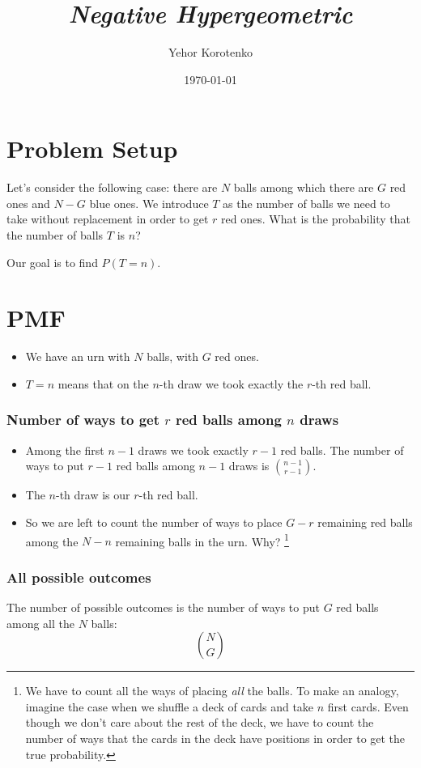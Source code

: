 \documentclass[12pt]{article}
\title{\textit{Negative Hypergeometric}}
\author{Yehor Korotenko}
\date{\today}
\begin{document}
\maketitle

\section*{Problem Setup}
Let's consider the following case: there are $N$ balls among which there are $G$
red ones and $N - G$ blue ones. We introduce $T$ as the number of balls we need
to take without replacement in order to get $r$ red ones. What is the probability 
that the number of balls $T$ is $n$?

Our goal is to find $P(T = n)$.

\section*{PMF}
\begin{itemize}
    \item We have an urn with $N$ balls, with $G$ red ones.
    \item $T = n$ means that on the $n$-th draw we took exactly the $r$-th red ball.
\end{itemize}

\subsubsection*{Number of ways to get $r$ red balls among $n$ draws}
\begin{itemize}
    \item Among the first $n-1$ draws we took exactly $r-1$ red balls. The number of ways 
    to put $r-1$ red balls among $n-1$ draws is $\binom{n-1}{r-1}$.
    \item The $n$-th draw is our $r$-th red ball.
    \item So we are left to count the number of ways to place $G-r$ remaining red balls among 
    the $N-n$ remaining balls in the urn. Why? \footnote{We have to count all the ways of placing 
    \emph{all} the balls. To make an analogy, imagine the case when we shuffle a deck of cards and take 
    $n$ first cards. Even though we don't care about the rest of the deck, we have to count the 
    number of ways that the cards in the deck have positions in order to get the true probability.}
\end{itemize}

\subsubsection*{All possible outcomes}
The number of possible outcomes is the number of ways to put $G$ red balls among all the $N$ balls:
\[
\binom{N}{G}
\]
\end{document}
